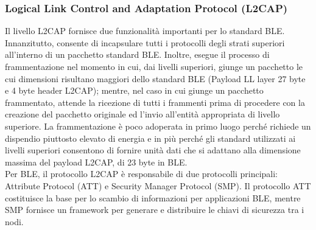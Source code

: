 \subsubsection{Logical Link Control and Adaptation Protocol (L2CAP)}
Il livello L2CAP fornisce due funzionalità importanti per lo standard BLE. Innanzitutto, consente di incapsulare tutti i protocolli degli strati superiori all'interno di un pacchetto standard BLE. Inoltre, esegue il processo di frammentazione nel momento in cui, dai livelli superiori, giunge un pacchetto le cui dimensioni risultano maggiori dello standard BLE (Payload LL layer 27 byte e 4 byte header L2CAP); mentre, nel caso in cui giunge un pacchetto frammentato, attende la ricezione di tutti i frammenti prima di procedere con la creazione del pacchetto originale ed l'invio all'entità appropriata di livello superiore. La frammentazione è poco adoperata in primo luogo perché richiede un dispendio piuttosto elevato di energia e in più perché gli standard utilizzati ai livelli superiori consentono di fornire unità dati che si adattano alla dimensione massima del payload L2CAP, di 23 byte in BLE. \\
Per BLE, il protocollo L2CAP è responsabile di due protocolli principali: Attribute Protocol (ATT) e Security Manager Protocol (SMP). Il protocollo ATT costituisce la base per lo scambio di informazioni per applicazioni BLE, mentre SMP fornisce un framework per generare e distribuire le chiavi di sicurezza tra i nodi.

